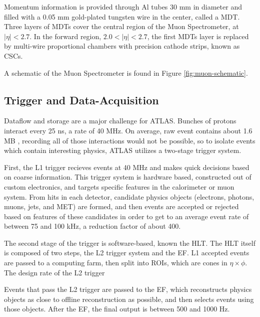 Momentum information is provided through Al tubes 30 mm in diameter and filled with a 0.05 mm gold-plated tungsten wire in the center, called a \gls{MDT}. Three layers of \glspl{MDT} cover the central region of the Muon Spectrometer, at $|\eta| < 2.7$. In the forward region, $2.0<|\eta|<2.7$, the first \glspl{MDT} layer is replaced by multi-wire proportional chambers with precision cathode strips, known as \glspl{CSC}.

A schematic of the Muon Spectrometer is found in Figure \ref{fig:muon-schematic}.

\subsection{Trigger and Data-Acquisition} \label{ssec:tdaq}

Dataflow and storage are a major challenge for ATLAS. Bunches of protons interact every 25 ns, a rate of 40 MHz. On average, raw event contains about 1.6 MB \cite{ATLASfact-sheet}, recording all of those interactions would not be possible, so to isolate events which contain interesting physics, ATLAS utilizes a two-stage trigger system.

First, the \gls{L1} trigger recieves events at 40 MHz and makes quick decisions based on coarse information. This trigger system is hardware based, constructed out of custom electronics, and targets specific features in the calorimeter or muon system. From hits in each detector, candidate physics objects (electrons, photons, muons, jets, and \gls{MET}) are formed, and then events are accepted or rejected based on features of these candidates in order to get to an average event rate of between 75 and 100 kHz, a reduction factor of about 400.

The second stage of the trigger is software-based, known the \gls{HLT}. The \gls{HLT} itself is composed of two steps, the \gls{L2} trigger system and the \gls{EF}. \gls{L1} accepted events are passed to a computing farm, then split into \glspl{ROI}, which are cones in $\eta \times \phi$. The design rate of the \gls{L2} trigger 

Events that pass the \gls{L2} trigger are passed to the \gls{EF}, which reconstructs physics objects as close to offline reconstruction as possible, and then selects events using those objects. After the \gls{EF}, the final output is between 500 and 1000 Hz.

